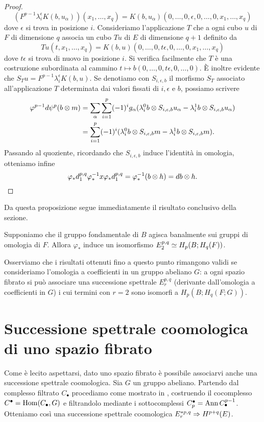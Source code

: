 \begin{proof}
$$
(F^{p-1}\lambda^\epsilon_iK(b,u_\alpha))(x_1,\ldots,x_q)=K(b,u_\alpha)(0,\ldots,0,\epsilon,0,\ldots,0,x_1,\ldots,x_q)
$$
dove $\epsilon$ si trova in posizione $i$. Consideriamo l'applicazione $T$ che a ogni cubo $u$ di $F$ di dimensione $q$ associa un cubo $Tu$ di $E$ di dimensione $q+1$ definito da
$$
Tu(t,x_1,\ldots,x_q)=K(b,u)(0,\ldots,0,t\epsilon,0,\ldots,0,x_1,\ldots,x_q)
$$
dove $t\epsilon$ si trova di nuovo in posizione $i$. Si verifica facilmente che $T$ è una costruzione subordinata al cammino $t\mapsto b(0,\ldots,0,t\epsilon,0,\ldots,0)$. È inoltre evidente che $S_Tu=F^{p-1}\lambda^\epsilon_iK(b,u)$. Se denotiamo con $S_{i,\epsilon,b}$ il morfismo $S_T$ associato all'applicazione $T$ determinata dai valori fissati di $i,\epsilon$ e $b$, possiamo scrivere
\begin{align*}
\varphi^{p-1}d\psi^p(b\mathbin{\otimes} m)&=\sum_\alpha\sum_{i=1}^p(-1)^{i}g_\alpha(\lambda^0_ib\mathbin{\otimes} S_{i,\epsilon,b}u_\alpha-\lambda^1_ib\mathbin{\otimes} S_{i,\epsilon,b}u_\alpha)\\
&=\sum_{i=1}^p(-1)^i(\lambda^0_ib\mathbin{\otimes} S_{i,\epsilon,b}m-\lambda^1_ib\mathbin{\otimes} S_{i,\epsilon,b}m).
\end{align*}
Passando al quoziente, ricordando che $S_{i,\epsilon, b}$ induce l'identità in omologia, otteniamo infine
$$
\varphi_*d^{p,q}_1\varphi_*^{-1}x\varphi_*d^{p,q}_1=\varphi_*^{-1}(b\mathbin{\otimes} h)=db\mathbin{\otimes} h.
$$
\end{proof}
Da questa proposizione segue immediatamente il risultato conclusivo della sezione.
\begin{proposition}
Supponiamo che il gruppo fondamentale di $B$ agisca banalmente sui gruppi di omologia di $F$. Allora $\varphi_*$ induce un isomorfismo $E^{p,q}_2\simeq H_p(B;H_q(F))$.
\end{proposition}

Osserviamo che i risultati ottenuti fino a questo punto rimangono validi se consideriamo l'omologia a coefficienti in un gruppo abeliano $G$: a ogni spazio fibrato si può associare una successione spettrale $E^{p,q}_r$ (derivante dall'omologia a coefficienti in $G$) i cui termini con $r=2$ sono isomorfi a $H_p(B;H_q(F;G))$.

\section{Successione spettrale coomologica di uno spazio fibrato}
Come è lecito aspettarsi, dato uno spazio fibrato è possibile associarvi anche una successione spettrale coomologica. Sia $G$ un gruppo abeliano. Partendo dal complesso filtrato $C_\bullet$ procediamo come mostrato in \missing{}, costruendo il cocomplesso $C^\bullet=\operatorname{Hom}(C_\bullet, G)$ e filtrandolo mediante i sottocomplessi $C^\bullet_p=\operatorname{Ann} C^{p-1}_\bullet$. Otteniamo così una successione spettrale coomologica $E^{\ast p,q}_r \Rightarrow H^{p+q}(E)$.

